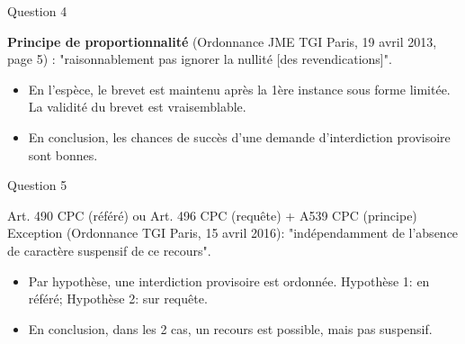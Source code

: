 \begin{frame}{Question 4}

\begin{block}{}
\textbf{Principe de proportionnalité} (Ordonnance JME TGI Paris, 19 avril 2013, page 5) :
"raisonnablement pas ignorer la nullité [des revendications]". 
\end{block}

\begin{itemize}
  \item En l'espèce, le brevet est maintenu après la 1ère instance sous forme limitée.
  La validité du brevet est vraisemblable.
  \item En conclusion, les chances de succès d'une demande d'interdiction provisoire sont bonnes.
\end{itemize}

\end{frame}

\begin{frame}{Question 5}

\begin{block}{}
Art. 490 CPC (référé) ou Art. 496 CPC (requête) + A539 CPC (principe)
\\ Exception (Ordonnance TGI Paris, 15 avril 2016): "indépendamment de
l'absence de caractère suspensif de ce recours".
\end{block}

\begin{itemize}
  \item Par hypothèse, une interdiction provisoire est ordonnée.
  Hypothèse 1: en référé; Hypothèse 2: sur requête.
  \item En conclusion, dans les 2 cas, un recours est possible,
  mais pas suspensif.
\end{itemize}

\end{frame}
